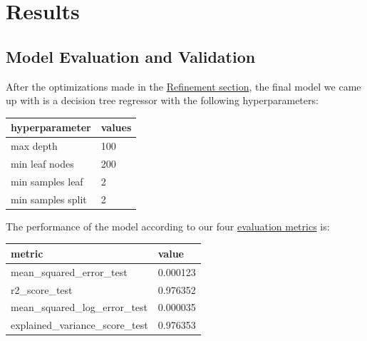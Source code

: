 \documentclass{article}
\begin{document}
\section{Results}
\subsection{Model Evaluation and Validation}

After the optimizations made in the \hyperlink{refinement}{Refinement section}, the final model we came up with is a decision tree regressor with the following hyperparameters:

\begin{center}
\begin{tabular}{ |l|l| }
  \hline
  hyperparameter & values\\
  \hline
  max depth & 100\\
  min leaf nodes & 200\\
  min samples leaf & 2\\
  min samples split & 2\\
  \hline
\end{tabular}
\end{center}

The performance of the model according to our four \hyperlink{metrics}{evaluation metrics} is:

\begin{center}
\begin{tabular}{ |l|l| }
  \hline
  metric & value\\
  \hline
  mean\_squared\_error\_test & 0.000123\\
  r2\_score\_test & 0.976352\\
  mean\_squared\_log\_error\_test & 0.000035\\
  explained\_variance\_score\_test & 0.976353\\
  \hline
\end{tabular}
\end{center}
\end{document}
